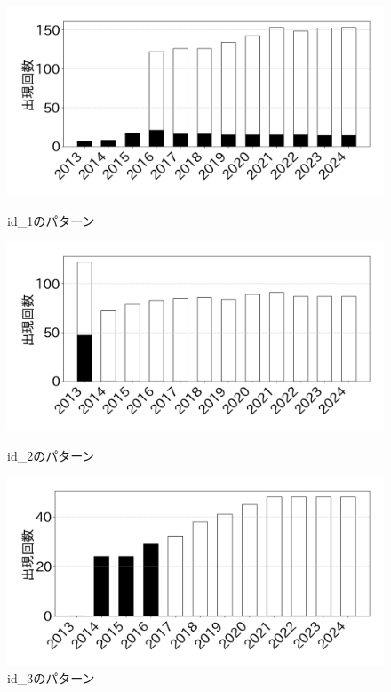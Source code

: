\documentclass[11pt]{jreport}
\begin{document}
\begin{figure}[h]
    \centering
        \includegraphics[width=0.9\linewidth]{@BSthesis2024_Noguchi/Noguchi_fig/id_1.png}
        \vspace{-4mm}
        \caption{id\_1のパターン}
        \label{table:id_1}
        
        \includegraphics[width=0.9\linewidth]{@BSthesis2024_Noguchi/Noguchi_fig/id_2.png}
        \vspace{-4mm}
        \caption{id\_2のパターン}
        \label{table:id_2}
        
        \includegraphics[width=0.9\linewidth]{@BSthesis2024_Noguchi/Noguchi_fig/id_3.png}
        \vspace{-4mm}
        \caption{id\_3のパターン}
        \label{table:id_3}
        

\end{figure}
\end{document}
